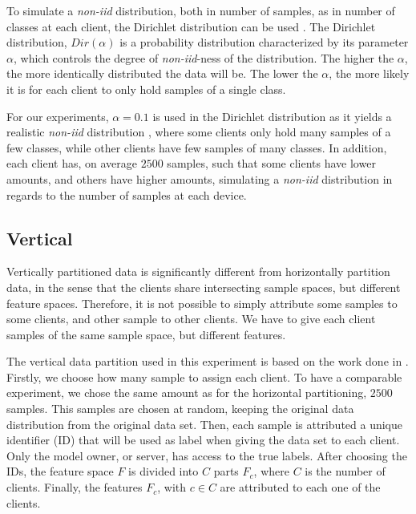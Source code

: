 To simulate a \textit{non-iid} distribution, both in number of samples, as in number of classes at each client, the Dirichlet distribution can be used \cite{tim, 10.48550/arxiv.2006.07242}. The Dirichlet distribution, $Dir(\alpha)$ is a probability distribution characterized by its parameter $\alpha$, which controls the degree of \textit{non-iid}-ness of the distribution. The higher the $\alpha$, the more identically distributed the data will be. The lower the $\alpha$, the more likely it is for each client to only hold samples of a single class.

For our experiments, $\alpha = 0.1$ is used in the Dirichlet distribution as it yields a realistic \textit{non-iid} distribution \cite{10.48550/arxiv.2006.07242}, where some clients only hold many samples of a few classes, while other clients have few samples of many classes. In addition, each client has, on average $2500$ samples, such that some clients have lower amounts, and others have higher amounts, simulating a \textit{non-iid} distribution in regards to the number of samples at each device.

\subsection{Vertical}

Vertically partitioned data is significantly different from horizontally partition data, in the sense that the clients share intersecting sample spaces, but different feature spaces. Therefore, it is not possible to simply attribute some samples to some clients, and other sample to other clients. We have to give each client samples of the same sample space, but different features.

The vertical data partition used in this experiment is based on the work done in \cite{10.48550/arxiv.2104.00489}. Firstly, we choose how many sample to assign each client. To have a comparable experiment, we chose the same amount as for the horizontal partitioning, $2500$ samples. This samples are chosen at random, keeping the original data distribution from the original data set. Then, each sample is attributed a unique identifier (ID) that will be used as label when giving the data set to each client. Only the model owner, or server, has access to the true labels. After choosing the IDs, the feature space $F$ is divided into $C$ parts $F_c$, where $C$ is the number of clients. Finally, the features $F_c$, with $c \in C$ are attributed to each one of the clients.

